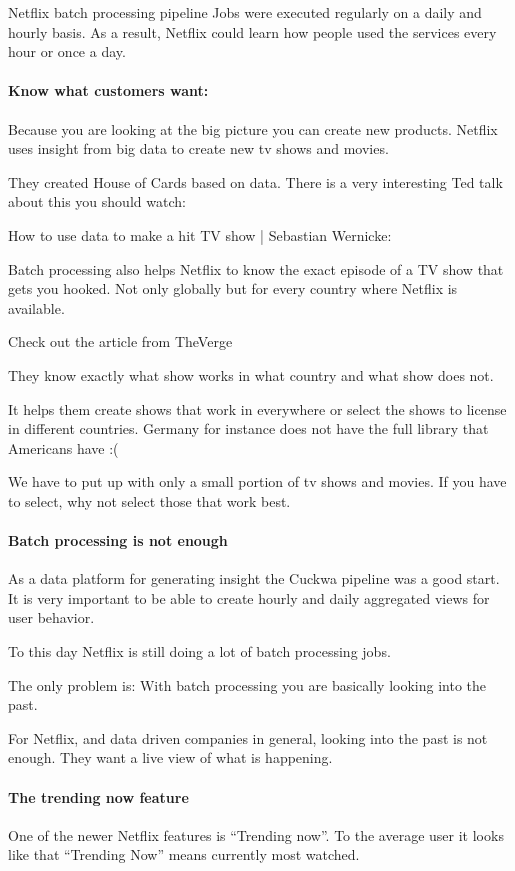 \documentclass[12pt, numbers=noenddot]{scrreprt} %
\begin{document}
Netflix batch processing pipeline
Jobs were executed regularly on a daily and hourly basis. As a result, Netflix could learn how people used the services every hour or once a day.

\paragraph{Know what customers want:}

Because you are looking at the big picture you can create new products. Netflix uses insight from big data to create new tv shows and movies.

They created House of Cards based on data. There is a very interesting Ted talk about this you should watch:

How to use data to make a hit TV show | Sebastian Wernicke:


Batch processing also helps Netflix to know the exact episode of a TV show that gets you hooked. Not only globally but for every country where Netflix is available.

Check out the article from TheVerge

They know exactly what show works in what country and what show does not.

It helps them create shows that work in everywhere or select the shows to license in different countries. Germany for instance does not have the full library that Americans have :(

We have to put up with only a small portion of tv shows and movies. If you have to select, why not select those that work best.

\paragraph{Batch processing is not enough}

As a data platform for generating insight the Cuckwa pipeline was a good start. It is very important to be able to create hourly and daily aggregated views for user behavior.

To this day Netflix is still doing a lot of batch processing jobs.

The only problem is: With batch processing you are basically looking into the past.

For Netflix, and data driven companies in general, looking into the past is not enough. They want a live view of what is happening.

\paragraph{The trending now feature}
One of the newer Netflix features is “Trending now”. To the average user it looks like that “Trending Now” means currently most watched.
\end{document}
